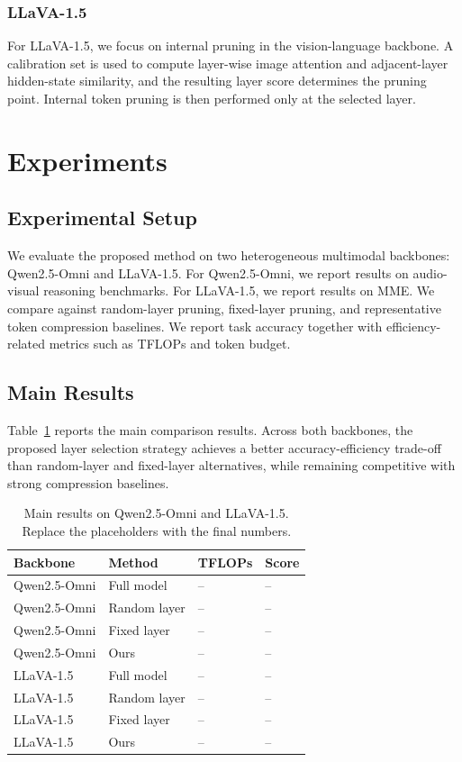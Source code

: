 \documentclass[10pt,a4paper]{article}
\begin{document}
\subsubsection{LLaVA-1.5}
For LLaVA-1.5, we focus on internal pruning in the vision-language backbone. A calibration set is used to compute layer-wise image attention and adjacent-layer hidden-state similarity, and the resulting layer score determines the pruning point. Internal token pruning is then performed only at the selected layer.

\section{Experiments}

\subsection{Experimental Setup}
We evaluate the proposed method on two heterogeneous multimodal backbones: Qwen2.5-Omni and LLaVA-1.5. For Qwen2.5-Omni, we report results on audio-visual reasoning benchmarks. For LLaVA-1.5, we report results on MME. We compare against random-layer pruning, fixed-layer pruning, and representative token compression baselines. We report task accuracy together with efficiency-related metrics such as TFLOPs and token budget.

\subsection{Main Results}
Table~\ref{tab:main_results} reports the main comparison results. Across both backbones, the proposed layer selection strategy achieves a better accuracy-efficiency trade-off than random-layer and fixed-layer alternatives, while remaining competitive with strong compression baselines.

\begin{table}[t]
\centering
\caption{Main results on Qwen2.5-Omni and LLaVA-1.5. Replace the placeholders with the final numbers.}
\label{tab:main_results}
\small
\begin{tabular}{p{2.2cm}p{2.1cm}p{1.4cm}p{1.4cm}}
\toprule
Backbone & Method & TFLOPs & Score \\
\midrule
Qwen2.5-Omni & Full model & -- & -- \\
Qwen2.5-Omni & Random layer & -- & -- \\
Qwen2.5-Omni & Fixed layer & -- & -- \\
Qwen2.5-Omni & Ours & -- & -- \\
\midrule
LLaVA-1.5 & Full model & -- & -- \\
LLaVA-1.5 & Random layer & -- & -- \\
LLaVA-1.5 & Fixed layer & -- & -- \\
LLaVA-1.5 & Ours & -- & -- \\
\bottomrule
\end{tabular}
\end{table}
\end{document}
